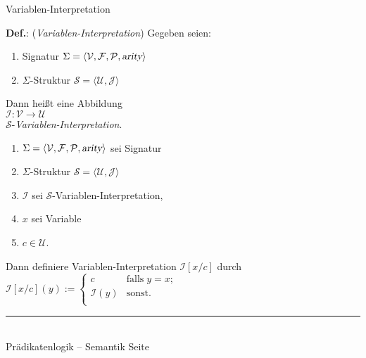 \documentclass{slides}
\newcommand{\myrule}{\rule{20cm}{1mm}\\ }
\newcommand{\struct}{\mathcal{S}}
\newcounter{mypage}
\begin{document}
\begin{slide}{}
\normalsize
\begin{center}
Variablen-Interpretation
\end{center}
\vspace{0.5cm}

\footnotesize
\textbf{Def.}: (\emph{Variablen-Interpretation}) \quad Gegeben seien:
\begin{enumerate}
\item Signatur \quad
      $\Sigma = \langle \mathcal{V}, \mathcal{F}, \mathcal{P}, \textsl{arity} \rangle$ 
\item $\Sigma$-Struktur \quad $\struct = \langle \mathcal{U}, \mathcal{J} \rangle$ 
\end{enumerate}
Dann heißt eine Abbildung \\[0.3cm]
\hspace*{1.3cm} $\mathcal{I}: \mathcal{V} \rightarrow \mathcal{U}$ \\[0.3cm]
$\struct$-\emph{Variablen-Interpretation}.

\begin{enumerate}
\item $\Sigma = \langle \mathcal{V}, \mathcal{F}, \mathcal{P}, \textsl{arity} \rangle$ 
      sei Signatur
\item $\Sigma$-Struktur $\struct = \langle \mathcal{U}, \mathcal{J} \rangle$ 
\item $\mathcal{I}$ sei $\struct$-Variablen-Interpretation,

\item $x$ sei Variable 
\item $c \in \mathcal{U}$.
\end{enumerate}
Dann definiere Variablen-Interpretation $\mathcal{I}[x/c]$ durch \\[0.1cm]
\hspace*{1.3cm} 
    $\mathcal{I}[x/c](y) := \left\{
    \begin{array}{ll}
    c               & \mbox{falls}\; y = x;  \\
    \mathcal{I}(y)  & \mbox{sonst}.          \\
    \end{array}
    \right.$ 

\vspace*{\fill}
\tiny \addtocounter{mypage}{1}
\myrule
Prädikatenlogik -- Semantik  \hspace*{\fill} Seite 
\end{slide}

\end{document}
